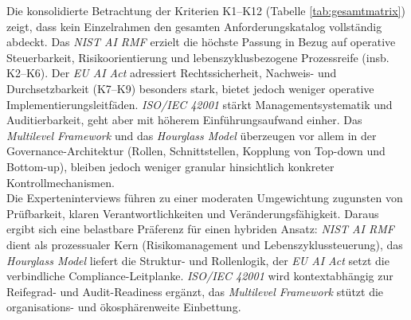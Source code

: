 Die konsolidierte Betrachtung der Kriterien K1–K12 (Tabelle \ref{tab:gesamtmatrix}) zeigt, dass kein Einzelrahmen den gesamten Anforderungskatalog vollständig abdeckt.
Das \textit{NIST AI RMF} erzielt die höchste Passung in Bezug auf operative Steuerbarkeit, Risikoorientierung und lebenszyklusbezogene Prozessreife (insb. K2–K6).
Der \textit{EU AI Act} adressiert Rechtssicherheit, Nachweis- und Durchsetzbarkeit (K7–K9) besonders stark, bietet jedoch weniger operative Implementierungsleitfäden.
\textit{ISO/IEC 42001} stärkt Managementsystematik und Auditierbarkeit, geht aber mit höherem Einführungsaufwand einher.
Das \textit{Multilevel Framework} und das \textit{Hourglass Model} überzeugen vor allem in der Governance-Architektur (Rollen, Schnittstellen, Kopplung von Top-down und Bottom-up), bleiben jedoch weniger granular hinsichtlich konkreter Kontrollmechanismen.
\\
Die Experteninterviews führen zu einer moderaten Umgewichtung zugunsten von Prüfbarkeit, klaren Verantwortlichkeiten und Veränderungsfähigkeit.
Daraus ergibt sich eine belastbare Präferenz für einen hybriden Ansatz:
\textit{NIST AI RMF} dient als prozessualer Kern (Risikomanagement und Lebenszyklussteuerung), das \textit{Hourglass Model} liefert die Struktur- und Rollenlogik, der \textit{EU AI Act} setzt die verbindliche Compliance-Leitplanke.
\textit{ISO/IEC 42001} wird kontextabhängig zur Reifegrad- und Audit-Readiness ergänzt, das \textit{Multilevel Framework} stützt die organisations- und ökosphärenweite Einbettung.